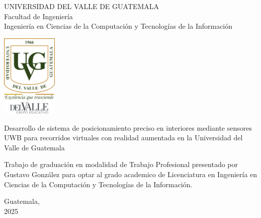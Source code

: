 \documentclass{article}
\begin{document}
\begin{center}
    \begin{doublespace}
        \thispagestyle{empty}  %
        \Large{UNIVERSIDAD DEL VALLE DE GUATEMALA}\\
        Facultad de Ingeniería \\
        Ingeniería en Ciencias de la Computación y Tecnologías de la Información 
    
        \vspace{15mm} 
        \includegraphics[width=0.2\textwidth]{images/Uvg_logo.jpg}
    
        \vspace{15mm} 
        {\Large  Desarrollo de sistema de posicionamiento preciso en interiores mediante sensores UWB para recorridos virtuales con realidad aumentada en la Universidad del Valle de Guatemala}
    
        \vspace{10mm} 
        {\Large Trabajo de graduación en modalidad de Trabajo Profesional presentado por Gustavo González
    para optar al grado academico de Licenciatura en Ingeniería en Ciencias de la Computación y Tecnologías de la Información.}
    
        {\Large Guatemala, \\ 2025}
        
    \end{doublespace}
    \end{center}

\tableofcontents
\newpage

\setcounter{page}{1} %
\end{document}
